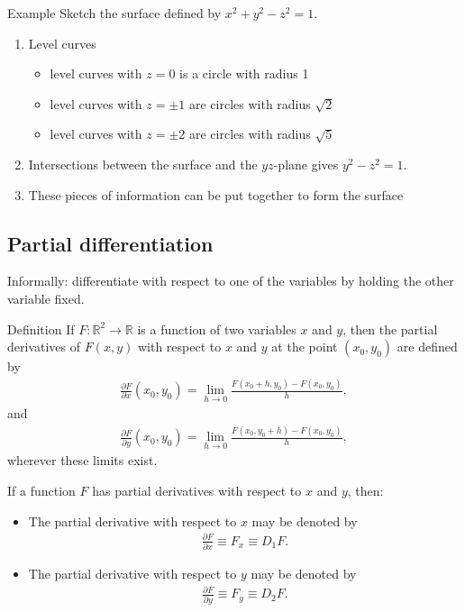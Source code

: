 \documentclass{report}
\begin{document}
			\begin{question}{Example}
				Sketch the surface defined by $x^2 + y^2 - z^2 = 1$.

				\begin{enumerate}
					\item Level curves
						\begin{itemize}
							\item level curves with $z = 0$ is a circle with radius 1
							\item level curves with $z = \pm 1$ are circles with radius $\sqrt{2}$
							\item level curves with $z = \pm 2$ are circles with radius $\sqrt{5}$
						\end{itemize}
					\item Intersections between the surface and the $yz$-plane gives $y^2 - z^2 = 1$.
					\item These pieces of information can be put together to form the surface
				\end{enumerate}
				
			\end{question}

		\subsection{Partial differentiation}

			Informally: differentiate with respect to one of the variables by holding the other variable fixed.

			\begin{question}{Definition}
				If $F: \mathbb{R}^2 \to \mathbb{R}$ is a function of two variables $x$ and $y$, then the partial derivatives of $F(x,y)$ with respect to $x$ and $y$ at the point $(x_0, y_0)$ are defined by
					\begin{align*}
						\frac{\partial F}{\partial x} (x_0, y_0) = \lim_{h\to 0} \frac{F(x_0 + h, y_0) - F(x_0, y_0)}{h},
					\end{align*}
				and
					\begin{align*}
						\frac{\partial F}{\partial y} (x_0, y_0) = \lim_{h\to 0} \frac{F(x_0, y_0 + h) - F(x_0, y_0)}{h},
					\end{align*}
				wherever these limits exist.
			\end{question}

			If a function $F$ has partial derivatives with respect to $x$ and $y$, then:
				\begin{itemize}
					\item The partial derivative with respect to $x$ may be denoted by
						\begin{align*}
							\frac{\partial F}{\partial x} \equiv F_x \equiv D_1F.
						\end{align*}
					\item The partial derivative with respect to $y$ may be denoted by
						\begin{align*}
							\frac{\partial F}{\partial y} \equiv F_y \equiv D_2F.
						\end{align*}
				\end{itemize}
\end{document}
